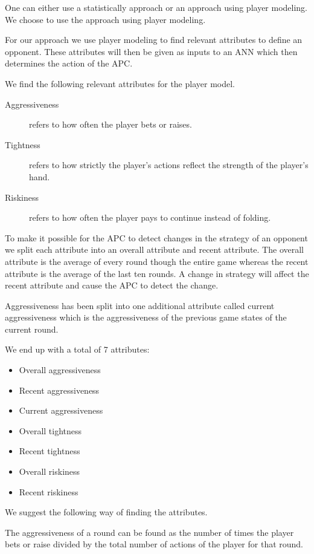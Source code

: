 One can either use a statistically approach or an approach using player modeling. We choose to use the approach using player modeling. 

For our approach we use player modeling to find relevant attributes to define an opponent. These attributes will then be given as inputs to an ANN which then determines the action of the APC. 

We find the following relevant attributes for the player model.

\begin{description}
\item[Aggressiveness] refers to how often the player bets or raises.
\item[Tightness] refers to how strictly the player's actions reflect the strength of the player's hand.
\item[Riskiness] refers to how often the player pays to continue instead of folding.
\end{description}

To make it possible for the APC to detect changes in the strategy of an opponent we split each attribute into an overall attribute and recent attribute. The overall attribute is the average of every round though the entire game whereas the recent attribute is the average of the last ten rounds. A change in strategy will affect the recent attribute and cause the APC to detect the change.

Aggressiveness has been split into one additional attribute called current aggressiveness which is the aggressiveness of the previous game states of the current round.

We end up with a total of 7 attributes:
\begin{itemize}
\item Overall aggressiveness
\item Recent aggressiveness
\item Current aggressiveness
\item Overall tightness
\item Recent tightness
\item Overall riskiness
\item Recent riskiness
\end{itemize}

We suggest the following way of finding the attributes.

The aggressiveness of a round can be found as the number of times the player bets or raise divided by the total number of actions of the player for that round.

